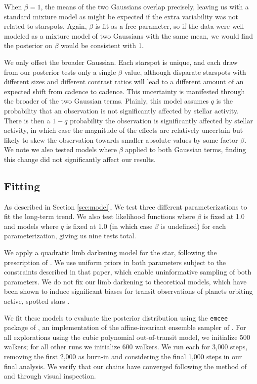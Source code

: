 \documentclass[twocolumn]{aastex63}
\begin{document}
When $\beta = 1$, the means of the two Gaussians overlap precisely, leaving us with a standard mixture model as might be expected if the extra variability was not related to starspots. Again, $\beta$ is fit as a free parameter, so if the data were well modeled as a mixture model of two Gaussians with the same mean, we would find the posterior on $\beta$ would be consistent with 1.

We only offset the broader Gaussian. Each starspot is unique, and each draw from our posterior tests only a single $\beta$ value, although disparate starspots with different sizes and different contrast ratios will lead to a different amount of an expected shift from cadence to cadence. 
This uncertainty is manifested through the broader of the two Gaussian terms.
Plainly, this model assumes $q$ is the probability that an observation is not significantly affected by stellar activity. There is then a $1-q$ probability the observation is significantly affected by stellar activity, in which case the magnitude of the effects are relatively uncertain but likely to skew the observation towards smaller absolute values by some factor $\beta$.
We note we also tested models where $\beta$ applied to both Gaussian terms, finding this change did not significantly affect our results.





\subsection{Fitting}

As described in Section \ref{sec:model}, We test three different parameterizations to fit the long-term trend. 
We also test likelihood functions where $\beta$ is fixed at 1.0 and models where $q$ is fixed at 1.0 (in which case $\beta$ is undefined) for each parameterization, giving us nine tests total.

We apply a quadratic limb darkening model for the star, following the prescription of \citet{Kipping13b}. We use uniform priors in both parameters subject to the constraints described in that paper, which enable uninformative sampling of both parameters. We do not fix our limb darkening to theoretical models, which have been shown to induce significant biases for transit observations of planets orbiting active, spotted stars \citep{Csizmadia13}.

We fit these models to evaluate the posterior distribution using the \texttt{emcee} package of \citet{Foreman-Mackey12}, an implementation of the affine-invariant ensemble sampler of \citet{Goodman10}.
For all explorations using the cubic polynomial out-of-transit model, we initialize 500 walkers; for all other runs we initialize 600 walkers. 
We run each for 3,000 steps, removing the first 2,000 as burn-in and considering the final 1,000 steps in our final analysis. 
We verify that our chains have converged following the method of \citet{Geweke92} and through visual inspection.
\end{document}
